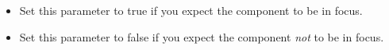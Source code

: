 \begin{itemize}
\item Set this parameter to true{} if you expect the component to be in focus.
\item Set this parameter to false{} if you expect the component \emph{not} to be in focus.
\end{itemize}
